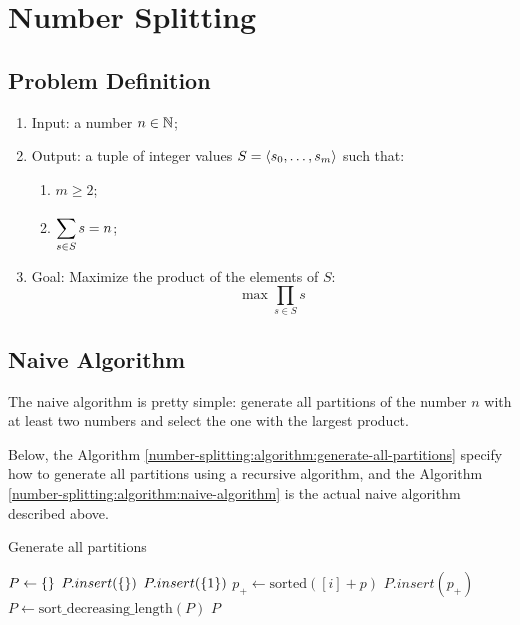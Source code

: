 \chapter{Number Splitting}

\newcommand{\Product}[2]{\prod\limits_{#1} #2}
\newcommand{\Floor}[1]{\left\lfloor #1 \right\rfloor}

\section{Problem Definition}

\begin{enumerate}
    \item Input: a number $n \in \mathbb{N}$;
    \item Output: a tuple of integer values $S = \left\langle s_{0}, \dots, s_{m} \right\rangle$ such that:
    \begin{enumerate}
        \item $m \geqslant 2$;
        \item $\displaystyle\sum\limits_{s \in S}^{} s = n$;
    \end{enumerate}
    \item Goal: Maximize the product of the elements of $S$:
    \begin{equation}
        \max \Product{s \in S}{s}
    \end{equation}
\end{enumerate}

\section{Naive Algorithm}

The naive algorithm is pretty simple: generate all partitions of the number $n$ with at least two numbers and select the one with the largest product.

Below, the Algorithm \ref{number-splitting:algorithm:generate-all-partitions} specify how to generate all partitions using a recursive algorithm, and the Algorithm \ref{number-splitting:algorithm:naive-algorithm} is the actual naive algorithm described above.

\begin{algorithm}[H]
    \caption{Generate all partitions}
    \label{number-splitting:algorithm:generate-all-partitions}
    \begin{algorithmic}[1]
            \State $P \gets \left\{  \right\}$
                \State $P.insert(\left\{  \right\})$
                \State $P.insert(\left\{ 1 \right\})$
            \EndIf
                    \State $p_+ \gets \text{sorted}([i] + p)$
                    \State $P.insert(p_+)$
                \EndFor
            \EndFor
            \State $P \gets \text{sort\_decreasing\_length}(P)$
            \State \Return $P$
        \EndFunction
        \end{algorithmic}
\end{algorithm}

